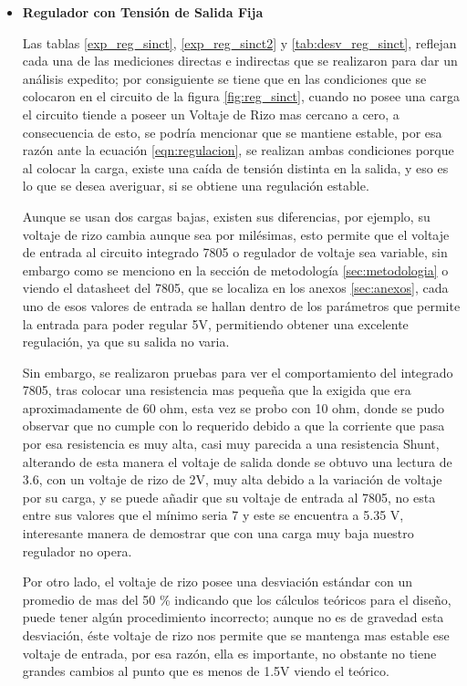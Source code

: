         \begin{itemize}
            \item \textbf{Regulador con Tensión de Salida Fija}

                Las tablas \ref{exp_reg_sinct}, \ref{exp_reg_sinct2} y \ref{tab:desv_reg_sinct}, reflejan cada una de las mediciones directas e indirectas que se realizaron para dar un análisis expedito; por consiguiente se tiene que en las condiciones que se colocaron en el circuito de la figura \ref{fig:reg_sinct}, cuando no posee una carga el circuito  tiende a poseer un Voltaje de Rizo mas cercano a cero, a consecuencia de esto, se podría mencionar que se mantiene estable, por esa razón ante la ecuación \ref{eqn:regulacion}, se realizan ambas condiciones porque al colocar la carga, existe una caída de tensión distinta en la salida, y eso es lo que se desea averiguar, si se obtiene una regulación estable.

                Aunque se usan dos cargas bajas, existen sus diferencias, por ejemplo, su voltaje de rizo cambia aunque sea por milésimas, esto permite que el voltaje de entrada al circuito integrado 7805 o regulador de voltaje sea variable, sin embargo como se menciono en la sección de metodología \ref{sec:metodologia} o viendo el datasheet del 7805, que se localiza en los anexos \ref{sec:anexos}, cada uno de esos valores de entrada se hallan dentro de los parámetros que permite la entrada para poder regular 5V, permitiendo obtener una excelente regulación, ya que su salida no varia. 

                Sin embargo, se realizaron pruebas para ver el comportamiento del integrado 7805, tras colocar una resistencia mas pequeña que la exigida que era aproximadamente de 60 ohm, esta vez se probo con 10 ohm, donde se pudo observar que no cumple con lo requerido debido a que la corriente que pasa por esa resistencia es muy alta, casi muy parecida a una resistencia Shunt, alterando de esta manera el voltaje de salida donde se obtuvo una lectura de 3.6, con un voltaje de rizo de 2V, muy alta debido a la variación de voltaje por su carga, y se puede añadir que su voltaje de entrada al 7805, no esta entre sus valores que el mínimo seria 7 y este se encuentra a 5.35 V, interesante manera de demostrar que con una carga muy baja nuestro regulador no opera.

                Por otro lado, el voltaje de rizo posee una desviación estándar con un promedio de mas del 50 \% indicando que los cálculos teóricos para el diseño, puede tener algún procedimiento incorrecto; aunque no es de gravedad esta desviación, éste voltaje de rizo nos permite que se mantenga mas estable ese voltaje de entrada, por esa razón, ella es importante, no obstante no tiene grandes cambios al punto que es menos de 1.5V viendo el teórico.


\end{itemize}
